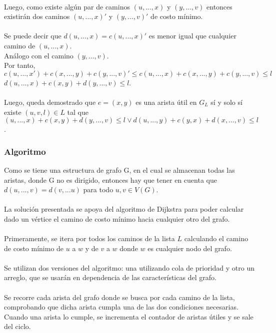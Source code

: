 \documentclass{article}
\begin{document}
\\
Luego, como existe algún par de caminos $(u,...,x)$ y $(y,...,v)$ entonces existirán dos caminos $(u,...,x)'$ y $(y,...,v)'$ de costo mínimo.
\\
\\
Se puede decir que $d(u,...,x) = c(u,...,x)'$ es menor igual que cualquier camino de $(u,...,x)$.
\\
Análogo con el camino $(y,...,v)$.
\\
Por tanto, $c(u,...,x') + c(x,...,y) + c(y,...,v)' \leq c(u,...,x) + c(x,...,y) + c(y,...,v) \leq l$
\\
$d(u,...,x) + c(x,y) + d(y,...,v) \leq l$.
\\
\\
Luego, queda demostrado que $e = (x,y)$ es una arista útil en $G_{L}$ sí y solo sí existe $(u,v,l) \in L$ tal que $(u,...,x) + c(x,y) + d(y,...,v) \leq l \vee d(u,...,y) + c(y,x) + d(x,...,v) \leq l$.

\subsubsection{Algoritmo}
Como se tiene una estructura de grafo G, en el cual se almacenan todas las aristas, donde G no es dirigido, entonces hay que tener en cuenta que $d(u,...,v) = d(v,...u)$ para todo $u,v \in V(G)$.
\\
\\
La solución presentada se apoya del algoritmo de Dijkstra para poder calcular dado un vértice el camino de costo mínimo hacia cualquier otro del grafo.
\\
\\
Primeramente, se itera por todos los caminos de la lista $L$ calculando el camino de costo mínimo de $u$ a $w$ y de $v$ a $w$ donde $w$ es cualquier nodo del grafo.
\\
\\
Se utilizan dos versiones del algoritmo: una utilizando cola de prioridad y otro un arreglo, que se usarán en dependencia de las características del grafo.
\\
\\
Se recorre cada arista del grafo donde se busca por cada camino de la lista, comprobando que dicha arista cumpla una de las dos condiciones necesarias. Cuando una arista lo cumple, se incrementa el contador de aristas útiles y se sale del ciclo.
\end{document}

